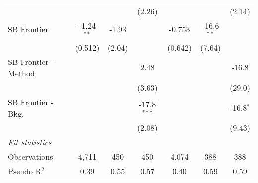 \begin{tabular}{lcccccc}
                        &                &         & (2.26)        &               &              & (2.14)\\   
   SB Frontier          & -1.24$^{**}$   & -1.93   &               & -0.753        & -16.6$^{**}$ &   \\   
                        & (0.512)        & (2.04)  &               & (0.642)       & (7.64)       &   \\   
   SB Frontier - Method &                &         & 2.48          &               &              & -16.8\\   
                        &                &         & (3.63)        &               &              & (29.0)\\   
   SB Frontier - Bkg.   &                &         & -17.8$^{***}$ &               &              & -16.8$^{*}$\\   
                        &                &         & (2.08)        &               &              & (9.43)\\   
   \midrule
   \emph{Fit statistics}\\
   Observations         & 4,711          & 450     & 450           & 4,074         & 388          & 388\\  
   Pseudo R$^2$         & 0.39           & 0.55    & 0.57          & 0.40          & 0.59         & 0.59\\  
   

\end{tabular}
